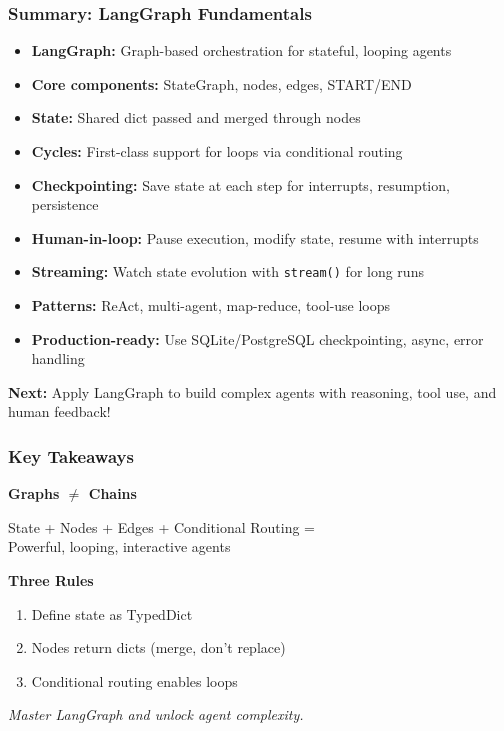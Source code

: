 \documentclass[aspectratio=169,11pt]{beamer}
\begin{document}
\begin{frame}
\frametitle{Summary: LangGraph Fundamentals}
\begin{itemize}
    \setlength{\itemsep}{1pt}
  \item \textbf{LangGraph:} Graph-based orchestration for stateful, looping agents
  \item \textbf{Core components:} StateGraph, nodes, edges, START/END
  \item \textbf{State:} Shared dict passed and merged through nodes
  \item \textbf{Cycles:} First-class support for loops via conditional routing
  \item \textbf{Checkpointing:} Save state at each step for interrupts, resumption, persistence
  \item \textbf{Human-in-loop:} Pause execution, modify state, resume with interrupts
  \item \textbf{Streaming:} Watch state evolution with \texttt{stream()} for long runs
  \item \textbf{Patterns:} ReAct, multi-agent, map-reduce, tool-use loops
  \item \textbf{Production-ready:} Use SQLite/PostgreSQL checkpointing, async, error handling
\end{itemize}

\vspace{15pt}
\textbf{Next:} Apply LangGraph to build complex agents with reasoning, tool use, and human feedback!
\end{frame}

\begin{frame}
\frametitle{Key Takeaways}
\begin{center}
\Large
\textbf{Graphs $\neq$ Chains}

\vspace{15pt}
\normalsize
State + Nodes + Edges + Conditional Routing = \\
Powerful, looping, interactive agents

\vspace{20pt}
\textbf{Three Rules}
\begin{enumerate}
    \setlength{\itemsep}{1pt}
  \item Define state as TypedDict
  \item Nodes return dicts (merge, don't replace)
  \item Conditional routing enables loops
\end{enumerate}

\vspace{20pt}
\textit{Master LangGraph and unlock agent complexity.}
\end{center}
\end{frame}
\end{document}
